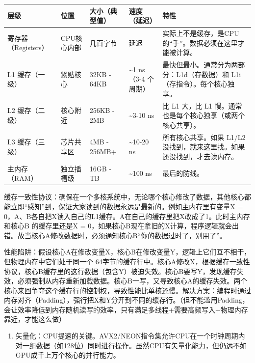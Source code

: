 \begin{longtable}[]{@{}
  >{\raggedright\arraybackslash}p{}
  >{\raggedright\arraybackslash}p{}
  >{\raggedright\arraybackslash}p{}
  >{\raggedright\arraybackslash}p{}
  >{\raggedright\arraybackslash}p{}@{}}
\toprule
层级 & 位置 & 大小（典型值） & 速度（延迟） & 特性 \\
\midrule
\endhead
寄存器（Registers） & CPU核心内部 & 几百字节 & 0 延迟 & 实际上不是缓存，是CPU的``手''。数据必须在这里才能被计算。 \\
L1 缓存（一级） & 紧贴核心 & 32KB - 64KB & \textasciitilde1 ns（3-4 个周期） & 最快但最小。通常分为两部分：L1d（存数据）和 L1i（存指令）。每个核心独享。 \\
L2 缓存（二级） & 核心附近 & 256KB - 2MB & \textasciitilde3-10 ns & 比 L1 大，比 L1 慢。通常也是每个核心独享（或两个核心共享）。 \\
L3 缓存（三级） & 芯片共享区 & 4MB - 256MB+ & \textasciitilde10-20 ns & 所有核心共享。如果 L1/L2 没找到，就来这里找。如果还没找到，才去读内存。 \\
主内存（RAM） & 独立插槽级 & 16GB - TB & \textasciitilde100 ns & 最后的防线。 \\
\bottomrule
\end{longtable}

缓存一致性协议：确保在一个多核系统中，无论哪个核心修改了数据，其他核心都能立即``感知''到，保证大家读到的数据永远是最新的。例如主内存里有变量X = 0，A、B各自把X读入自己的L1缓存。A在自己的缓存里把X改成了1。此时主内存和核心B 的缓存里还是X = 0，如果核心B现在拿旧的X计算，程序逻辑就会出错。故当核心A修改数据时，必须通知核心B``你的数据过时了，别用了''。

性能陷阱：假设核心A在修改变量X，核心B在修改变量Y，逻辑上它们互不相干，但物理内存中它们处于同一个 64字节的缓存行中。核心A修改X，根据缓存一致性协议，核心B缓存里的这行数据（包含Y）被迫失效。核心B要写Y，发现缓存失效，必须强制从内存重新加载数据。核心B一写，又导致核心A的缓存失效。两个核心来回争夺这个缓存行的控制权，导致性能比单核还慢。解决方案：编程时通过内存对齐（Padding），强行把X和Y分开到不同的缓存行。（但不能滥用Padding，会让效率降低到内存随机读写的效率，只有满足多线程+需要高频写入+物理内存靠近，才能这么做）

\begin{enumerate}
\def\labelenumi{\arabic{enumi}.}
\setcounter{enumi}{1}
\tightlist
\item
  矢量化：CPU提速的关键。AVX2/NEON指令集允许CPU在一个时钟周期内对一组数据（如128位）同时进行操作。虽然CPU有矢量化能力，但仍远不如GPU成千上万个核心的并行能力。
\end{enumerate}

